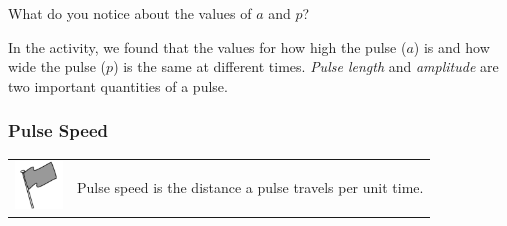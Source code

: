     \par
  
        
        \label{m38801*id313222}What do you notice about the values of \begin{math}a\end{math} and \begin{math}p\end{math}?
 \par 

        \label{m38801*id313246}In the activity, we found that the values for how high the pulse (\begin{math}a\end{math}) is and how wide the pulse (\begin{math}p\end{math}) is the same at different times. \textsl{Pulse length} and \textsl{amplitude} are two important quantities of a pulse.\par 
      
      \label{m38801*uid3}
            \subsubsection{ Pulse Speed}
            \nopagebreak
            
        
\par
            \label{m38801*fhsst!!!underscore!!!id145}\begin{definition}
	  \begin{tabular*}{15 cm}{m{15 mm}m{}}
	\hspace*{-50pt}  \includegraphics[width=0.5in]{col11305.imgs/psflag2.png}   & \Definition{   \label{id2435275}\textbf{ Pulse Speed }} { \label{m38801*meaningfhsst!!!underscore!!!id145}
        \label{m38801*id313292}Pulse speed is the distance a pulse travels per unit time. \par 
         } 
      \end{tabular*}
      \end{definition}

